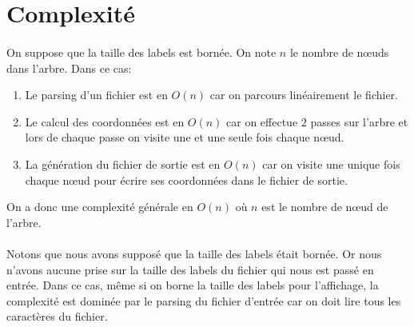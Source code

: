 \section{Complexité}

\paragraph{}On suppose que la taille des labels est bornée. On note $n$ le nombre de n\oe uds dans l'arbre. Dans ce cas:

\begin{enumerate}
	\item Le parsing d'un fichier est en $O(n)$ car on parcours linéairement le fichier.
	\item Le calcul des coordonnées est en $O(n)$ car on effectue $2$ passes sur l'arbre et lors de chaque passe on visite une et une seule fois chaque n\oe ud.
	\item La génération du fichier de sortie est en $O(n)$ car on visite une unique fois chaque n\oe ud pour écrire ses coordonnées dans le fichier de sortie.
\end{enumerate}
On a donc une complexité générale en $O(n)$ où $n$ est le nombre de n\oe ud de l'arbre.

\paragraph{}Notons que nous avons supposé que la taille des labels était bornée. Or nous n'avons aucune prise sur la taille des labels du fichier qui nous est passé en entrée. Dans ce cas, même si on borne la taille des labels pour l'affichage, la complexité est dominée par le parsing du fichier d'entrée car on doit lire tous les caractères du fichier.